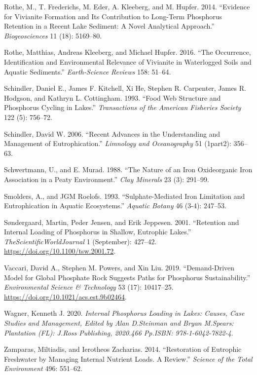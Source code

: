\documentclass[a4paper,11pt]{article}
\newenvironment{CSLReferences}%
  {}%
  {\par}
\begin{document}
\begin{CSLReferences}{1}{0}
\leavevmode\hypertarget{ref-rotheEvidenceVivianiteFormation2014}{}%
Rothe, M., T. Frederichs, M. Eder, A. Kleeberg, and M. Hupfer. 2014. {``Evidence for Vivianite Formation and Its Contribution to Long-Term Phosphorus Retention in a Recent Lake Sediment: A Novel Analytical Approach.''} \emph{Biogeosciences} 11 (18): 5169--80.

\leavevmode\hypertarget{ref-rotheOccurrenceIdentificationEnvironmental2016}{}%
Rothe, Matthias, Andreas Kleeberg, and Michael Hupfer. 2016. {``The Occurrence, Identification and Environmental Relevance of Vivianite in Waterlogged Soils and Aquatic Sediments.''} \emph{Earth-Science Reviews} 158: 51--64.

\leavevmode\hypertarget{ref-schindlerFoodWebStructure1993}{}%
Schindler, Daniel E., James F. Kitchell, Xi He, Stephen R. Carpenter, James R. Hodgson, and Kathryn L. Cottingham. 1993. {``Food Web Structure and Phosphorus Cycling in Lakes.''} \emph{Transactions of the American Fisheries Society} 122 (5): 756--72.

\leavevmode\hypertarget{ref-schindlerRecentAdvancesUnderstanding2006}{}%
Schindler, David W. 2006. {``Recent Advances in the Understanding and Management of Eutrophication.''} \emph{Limnology and Oceanography} 51 (1part2): 356--63.

\leavevmode\hypertarget{ref-schwertmannNatureIronOxide1988}{}%
Schwertmann, U., and E. Murad. 1988. {``The Nature of an Iron Oxide{}organic Iron Association in a Peaty Environment.''} \emph{Clay Minerals} 23 (3): 291--99.

\leavevmode\hypertarget{ref-smoldersSulphatemediatedIronLimitation1993}{}%
Smolders, A., and JGM Roelofs. 1993. {``Sulphate-Mediated Iron Limitation and Eutrophication in Aquatic Ecosystems.''} \emph{Aquatic Botany} 46 (3-4): 247--53.

\leavevmode\hypertarget{ref-sondergaardRetentionInternalLoading2001}{}%
Søndergaard, Martin, Peder Jensen, and Erik Jeppesen. 2001. {``Retention and {Internal Loading} of {Phosphorus} in {Shallow}, {Eutrophic Lakes}.''} \emph{TheScientificWorldJournal} 1 (September): 427--42. \url{https://doi.org/10.1100/tsw.2001.72}.

\leavevmode\hypertarget{ref-vaccariDemandDrivenModelGlobal2019}{}%
Vaccari, David A., Stephen M. Powers, and Xin Liu. 2019. {``Demand-{Driven Model} for {Global Phosphate Rock Suggests Paths} for {Phosphorus Sustainability}.''} \emph{Environmental Science \& Technology} 53 (17): 10417--25. \url{https://doi.org/10.1021/acs.est.9b02464}.

\leavevmode\hypertarget{ref-wagner2020}{}%
Wagner, Kenneth J. 2020. \emph{Internal Phosphorus Loading in Lakes: Causes, Case Studies and Management, Edited by Alan D.Steinman and Bryan M.Spears: Plantation (FL): J.Ross Publishing, 2020.466 Pp.ISBN: 978-1-6042-7822-4}.

\leavevmode\hypertarget{ref-zamparasRestorationEutrophicFreshwater2014}{}%
Zamparas, Miltiadis, and Ierotheos Zacharias. 2014. {``Restoration of Eutrophic Freshwater by Managing Internal Nutrient Loads. {A} Review.''} \emph{Science of the Total Environment} 496: 551--62.

\end{CSLReferences}
\end{document}

